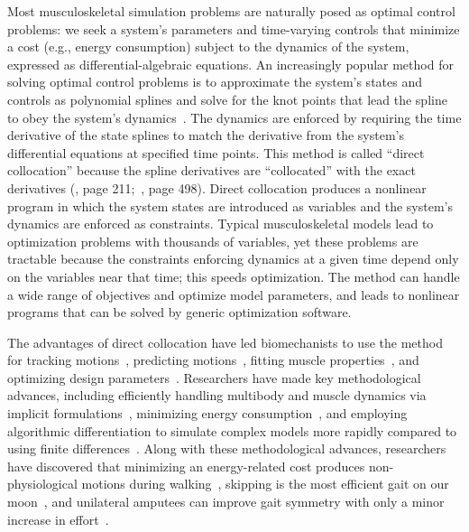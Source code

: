 \documentclass[10pt,letterpaper]{article}
\begin{document}
Most musculoskeletal simulation problems are naturally posed as optimal control problems: we seek a system's parameters and time-varying controls that minimize a cost (e.g., energy consumption) subject to the dynamics of the system, expressed as differential-algebraic equations. An increasingly popular method for solving optimal control problems is to approximate the system's states and controls as polynomial splines and solve for the knot points that lead the spline to obey the system's dynamics~\cite{Betts:2010,Umberger:2018ec,Mombaur:2016eb,Kelly:2017}. The dynamics are enforced by requiring the time derivative of the state splines to match the derivative from the system's differential equations at specified time points. This method is called “direct collocation” because the spline derivatives are “collocated” with the exact derivatives (\cite{Hairer:1993}, page 211;~\cite{Hairer:1996}, page 498). Direct collocation produces a nonlinear program in which the system states are introduced as variables and the system's dynamics are enforced as constraints. Typical musculoskeletal models lead to optimization problems with thousands of variables, yet these problems are tractable because the constraints enforcing dynamics at a given time depend only on the variables near that time; this speeds optimization. The method can handle a wide range of objectives and optimize model parameters, and leads to nonlinear programs that can be solved by generic optimization software.

The advantages of direct collocation have led biomechanists to use the method for tracking motions~\cite{Lin:2017jp,Mehrabi:2019}, predicting motions~\cite{Ackermann:2010dd,Miller:2015fc,Porsa:2015dn,Meyer:2016gl,Lee:2016dn,KMoore:2018ea,Lin:2018ex,Lai:2018,Nguyen:2019,Falisse:2019b}, fitting muscle properties~\cite{Falisse:2016}, and optimizing design parameters~\cite{Rohani:2017}. Researchers have made key methodological advances, including efficiently handling multibody and muscle dynamics via implicit formulations~\cite{vandenBogert:2011fv,Groote:2016dq}, minimizing energy consumption~\cite{Koelewijn:2018kw,Koelewijn:2019}, and employing algorithmic differentiation to simulate complex models more rapidly compared to using finite differences~\cite{Falisse:2019a}. Along with these methodological advances, researchers have discovered that minimizing an energy-related cost produces non-physiological motions during walking~\cite{Ackermann:2010dd}, skipping is the most efficient gait on our moon~\cite{Ackermann:2012}, and unilateral amputees can improve gait symmetry with only a minor increase in effort~\cite{Koelewijn:2016bm}.
\end{document}
